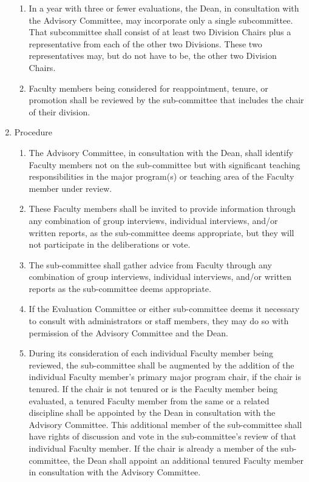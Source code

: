 \documentclass{manual}
\newcommand{\itemLevelA}{\alph*.}
\newcommand{\itemLevelB}{\arabic*)}
\newcommand{\itemRefA}{\alph*}
\newcommand{\itemRefB}{\arabic*}
\begin{document}
\begin{enumerate}[label=\itemLevelA,ref=\itemRefA]
\begin{enumerate}[label=\itemLevelB,ref=\itemRefB]
\item In a year with three or fewer evaluations, the Dean, in consultation with the Advisory Committee, may incorporate only a single subcommittee. That subcommittee shall consist of at least two Division Chairs plus a representative from each of the other two Divisions. These two representatives may, but do not have to be, the other two Division Chairs.
\item Faculty members being considered for reappointment, tenure, or promotion shall be reviewed by the sub-committee that includes the chair of their division.
\end{enumerate}
\item Procedure \label{item:procedure08}
\begin{enumerate}[label=\itemLevelB,ref=\itemRefB]
\item The Advisory Committee, in consultation with the Dean, shall identify Faculty members not on the sub-committee but with significant teaching responsibilities in the major program(s) or teaching area of the Faculty member under review.
\item These Faculty members shall be invited to provide information through any combination of group interviews, individual interviews, and/or written reports, as the sub-committee deems appropriate, but they will not participate in the deliberations or vote.
\item The sub-committee shall gather advice from Faculty through any combination of group interviews, individual interviews, and/or written reports as the sub-committee deems appropriate.
\item If the Evaluation Committee or either sub-committee deems it necessary to consult with administrators or staff members, they may do so with permission of the Advisory Committee and the Dean.
\item During its consideration of each individual Faculty member being reviewed, the sub-committee shall be augmented by the addition of the individual Faculty member's primary major program chair, if the chair is tenured. If the chair is not tenured or is the Faculty member being evaluated, a tenured Faculty member from the same or a related discipline shall be appointed by the Dean in consultation with the Advisory Committee. This additional member of the sub-committee shall have rights of discussion and vote in the sub-committee's review of that individual Faculty member. If the chair is already a member of the sub-committee, the Dean shall appoint an additional tenured Faculty member in consultation with the Advisory Committee.

\end{enumerate}
\end{enumerate}
\end{document}
